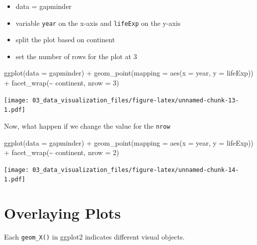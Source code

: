 \documentclass[
  10pt,
]{krantz}
\newenvironment{Shaded}{\begin{snugshade}}{\end{snugshade}}
\newcommand{\AttributeTok}[1]{\textcolor[rgb]{0.77,0.63,0.00}{#1}}
\newcommand{\DecValTok}[1]{\textcolor[rgb]{0.00,0.00,0.81}{#1}}
\newcommand{\FunctionTok}[1]{\textcolor[rgb]{0.00,0.00,0.00}{#1}}
\newcommand{\NormalTok}[1]{#1}
\newcommand{\SpecialCharTok}[1]{\textcolor[rgb]{0.00,0.00,0.00}{#1}}
\providecommand{\tightlist}{%
  \setlength{\itemsep}{0pt}\setlength{\parskip}{0pt}}
\begin{document}
\begin{itemize}
\tightlist
\item
  data = gapminder
\item
  variable \texttt{year} on the x-axis and \texttt{lifeExp} on the y-axis
\item
  split the plot based on continent
\item
  set the number of rows for the plot at 3
\end{itemize}

\begin{Shaded}
\begin{Highlighting}[]
\FunctionTok{ggplot}\NormalTok{(}\AttributeTok{data =}\NormalTok{ gapminder) }\SpecialCharTok{+}
  \FunctionTok{geom\_point}\NormalTok{(}\AttributeTok{mapping =} \FunctionTok{aes}\NormalTok{(}\AttributeTok{x =}\NormalTok{ year, }\AttributeTok{y =}\NormalTok{ lifeExp)) }\SpecialCharTok{+} 
  \FunctionTok{facet\_wrap}\NormalTok{(}\SpecialCharTok{\textasciitilde{}}\NormalTok{ continent, }\AttributeTok{nrow =} \DecValTok{3}\NormalTok{)}
\end{Highlighting}
\end{Shaded}

\texttt{[image: 03\_data\_visualization\_files/figure-latex/unnamed-chunk-13-1.pdf]}

Now, what happen if we change the value for the \texttt{nrow}

\begin{Shaded}
\begin{Highlighting}[]
\FunctionTok{ggplot}\NormalTok{(}\AttributeTok{data =}\NormalTok{ gapminder) }\SpecialCharTok{+}
  \FunctionTok{geom\_point}\NormalTok{(}\AttributeTok{mapping =} \FunctionTok{aes}\NormalTok{(}\AttributeTok{x =}\NormalTok{ year, }\AttributeTok{y =}\NormalTok{ lifeExp)) }\SpecialCharTok{+} 
  \FunctionTok{facet\_wrap}\NormalTok{(}\SpecialCharTok{\textasciitilde{}}\NormalTok{ continent, }\AttributeTok{nrow =} \DecValTok{2}\NormalTok{)}
\end{Highlighting}
\end{Shaded}

\texttt{[image: 03\_data\_visualization\_files/figure-latex/unnamed-chunk-14-1.pdf]}

\hypertarget{overlaying-plots}{%
\section{Overlaying Plots}\label{overlaying-plots}}

Each \texttt{geom\_X()} in ggplot2 indicates different visual objects.
\end{document}
